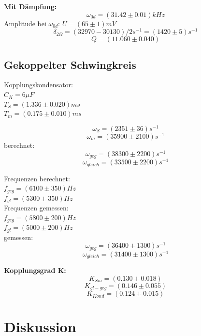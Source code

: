 \documentclass[12pt,a4paper]{article}
\begin{document}
\begin{multicols}{2}

\noindent \textbf{Mit Dämpfung:}\\
$$\omega_{0d} = (31.42 \pm 0.01) kHz$$
Amplitude bei $\omega_{0d}$: $U=(65 \pm 1)mV$\\
$$\delta_{2 \Omega} = (32970 - 30130)/2 s^{-1} = (1420 \pm 5) s^{-1}$$
$$Q = (11.060 \pm 0.040)$$

\subsection{Gekoppelter Schwingkreis}
Kopplungskondensator:\\
$C_K = 6\mu F$\\
$T_S = (1.336 \pm 0.020)ms$\\
$T_m = (0.175 \pm 0.010)ms$




$$\omega_S = (2351 \pm 36)s^{-1}$$
$$\omega_m = (35900 \pm 2100)s^{-1}$$
berechnet:\\
$$\omega_{geg} = (38300  \pm 2200)s^{-1}$$
$$\omega_{gleich} = (33500 \pm 2200)s^{-1}$$

\noindent Frequenzen berechnet:\\
$f_{geg}= (6100 \pm 350)Hz$\\
$f_{gl } = (5300 \pm 350)Hz$\\

\noindent Frequenzen gemessen:\\
$f_{geg} = (5800 \pm 200) Hz$\\
$f_{gl} = (5000 \pm 200) Hz$\\

\noindent gemessen:
$$\omega_{geg} = (36400  \pm 1300)s^{-1}$$
$$\omega_{gleich} = (31400 \pm 1300)s^{-1}$$

\noindent \textbf{Kopplungsgrad K:}\\
$$K_{Sm} = (0.130 \pm 0.018)$$
$$K_{gl-geg}=(0.146 \pm 0.055)$$
$$K_{Kond}=(0.124 \pm 0.015)$$


%



\section{Diskussion}


\end{multicols}
\end{document}
